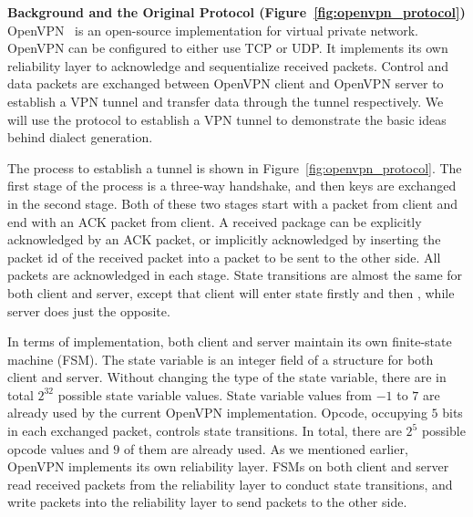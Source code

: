 {\textbf{Background and the Original Protocol (Figure~\ref{fig:openvpn_protocol})}}
OpenVPN~\citep{openvpn-wiki,openvpn} is an open-source implementation for virtual private network. 
OpenVPN can be configured to either use TCP or UDP. 
It implements its own reliability layer to acknowledge and sequentialize received packets.  
Control and data packets are exchanged between OpenVPN client and OpenVPN server 
to establish a VPN tunnel and transfer data through the tunnel respectively. 
We will use the protocol to establish a VPN tunnel 
to demonstrate the basic ideas behind dialect generation. 

The process to establish a tunnel is shown in Figure~\ref{fig:openvpn_protocol}.
The first stage of the process is a three-way handshake, 
and then keys are exchanged in the second stage. 
Both of these two stages start with a packet from client and end with an ACK packet from client. 
A received package can be explicitly acknowledged by an ACK packet,
or implicitly acknowledged by inserting the packet id 
of the received packet into a packet to be sent to the other side.
All packets are acknowledged in each stage.  
State transitions are almost the same for both client and server, 
except that client will enter  state firstly and then , 
while server does just the opposite. 


In terms of implementation, 
both client and server maintain its own finite-state machine (FSM).
The state variable is an integer field of a structure for both client and server.
Without changing the type of the state variable, 
there are in total $2^{32}$ possible state variable values. 
State variable values from $-1$ to $7$ are already used by the current OpenVPN implementation. 
Opcode, occupying $5$ bits in each exchanged packet, controls state transitions. 
In total, there are $2^5$ possible opcode values and $9$ of them are already used. 
As we mentioned earlier, OpenVPN implements its own reliability layer. 
FSMs on both client and server read received packets 
from the reliability layer to conduct state transitions, 
and write packets into the reliability layer to send packets to the other side. 


